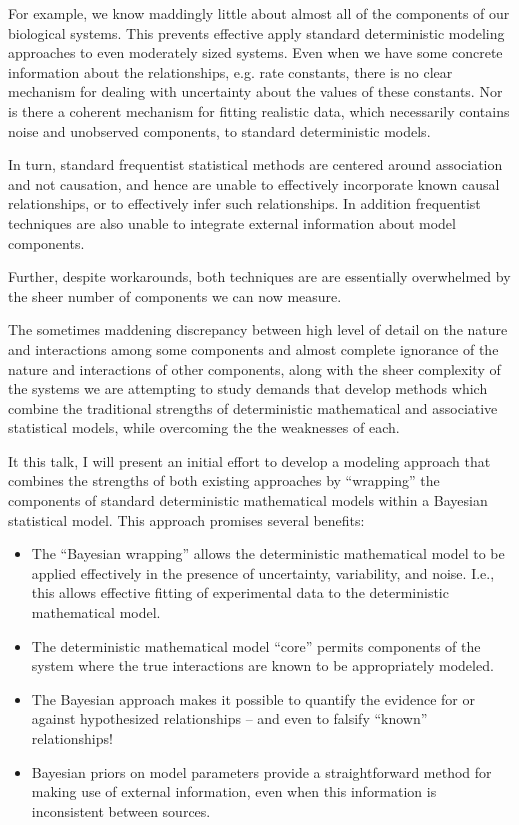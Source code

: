 \documentclass{beamer}
\begin{document}
  For example, we know maddingly little about almost all of the
  components of our biological systems.  This prevents effective apply
  standard deterministic modeling approaches to even moderately sized
  systems.  Even when we have some concrete information about the
  relationships, e.g. rate constants, there is no clear mechanism for
  dealing with uncertainty about the values of these constants.  Nor
  is there a coherent mechanism for fitting realistic data, which
  necessarily contains noise and unobserved components, to standard
  deterministic models.
  
  In turn, standard frequentist statistical methods are centered
  around association and not causation, and hence are unable to
  effectively incorporate known causal relationships, or to
  effectively infer such relationships.  In addition frequentist
  techniques are also unable to integrate external information about
  model components.
  
  Further, despite workarounds, both techniques are are essentially
  overwhelmed by the sheer number of components we can now measure.
  
  The sometimes maddening discrepancy between high level of detail on
  the nature and interactions among some components and almost
  complete ignorance of the nature and interactions of other
  components, along with the sheer complexity of the systems we are
  attempting to study demands that develop methods which combine the
  traditional strengths of deterministic mathematical and associative
  statistical models, while overcoming the the weaknesses of each.
  
  It this talk, I will present an initial effort to develop a modeling
  approach that combines the strengths of both existing approaches by
  ``wrapping'' the components of standard deterministic mathematical
  models within a Bayesian statistical model. This approach promises
  several benefits:
  \begin{itemize}
  \item The ``Bayesian wrapping'' allows the deterministic
    mathematical model to be applied effectively in the presence of
    uncertainty, variability, and noise. I.e., this allows effective
    fitting of experimental data to the deterministic mathematical
    model.
  \item The deterministic mathematical model ``core'' permits
    components of the system where the true interactions are known to
    be appropriately modeled.
  \item The Bayesian approach makes it possible to quantify the
    evidence for or against hypothesized relationships -- and even to
    falsify ``known'' relationships!
  \item Bayesian priors on model parameters provide a straightforward
    method for making use of external information, even when this
    information is inconsistent between sources.
  \end{itemize}
\end{document}
